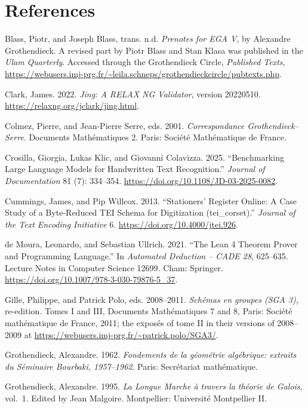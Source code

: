 \documentclass[11pt]{article}
\newcommand{\qq}[1]{“#1”}
\begin{document}
\section*{References}
\begin{list}{}{\setlength{\leftmargin}{1.5em}\setlength{\itemindent}{-1.5em}\setlength{\itemsep}{3pt}}
\item Blass, Piotr, and Joseph Blass, trans. n.d. \emph{Prenotes for EGA V}, by Alexandre Grothendieck. A revised part by Piotr Blass and Stan Klasa was published in the \emph{Ulam Quarterly}. Accessed through the Grothendieck Circle, \emph{Published Texts}, \url{https://webusers.imj-prg.fr/~leila.schneps/grothendieckcircle/pubtexts.php}.
\item Clark, James. 2022. \emph{Jing: A RELAX NG Validator}, version 20220510. \url{https://relaxng.org/jclark/jing.html}.
\item Colmez, Pierre, and Jean-Pierre Serre, eds. 2001. \emph{Correspondance Grothendieck--Serre}. Documents Mathématiques 2. Paris: Société Mathématique de France.
\item Crosilla, Giorgia, Lukas Klic, and Giovanni Colavizza. 2025. \qq{Benchmarking Large Language Models for Handwritten Text Recognition.} \emph{Journal of Documentation} 81 (7): 334--354. \url{https://doi.org/10.1108/JD-03-2025-0082}.
\item Cummings, James, and Pip Willcox. 2013. \qq{Stationers' Register Online: A Case Study of a Byte-Reduced TEI Schema for Digitization (tei\_corset).} \emph{Journal of the Text Encoding Initiative} 6. \url{https://doi.org/10.4000/jtei.926}.
\item de Moura, Leonardo, and Sebastian Ullrich. 2021. \qq{The Lean 4 Theorem Prover and Programming Language.} In \emph{Automated Deduction -- CADE 28}, 625--635. Lecture Notes in Computer Science 12699. Cham: Springer. \url{https://doi.org/10.1007/978-3-030-79876-5_37}.
\item Gille, Philippe, and Patrick Polo, eds. 2008--2011. \emph{Schémas en groupes (SGA 3)}, re-edition. Tomes I and III, Documents Mathématiques 7 and 8, Paris: Société mathématique de France, 2011; the exposés of tome II in their versions of 2008--2009 at \url{https://webusers.imj-prg.fr/~patrick.polo/SGA3/}.
\item Grothendieck, Alexandre. 1962. \emph{Fondements de la géométrie algébrique: extraits du Séminaire Bourbaki, 1957--1962}. Paris: Secrétariat mathématique.
\item Grothendieck, Alexandre. 1995. \emph{La Longue Marche à travers la théorie de Galois}, vol.~1. Edited by Jean Malgoire. Montpellier: Université Montpellier II.

\end{list}
\end{document}
